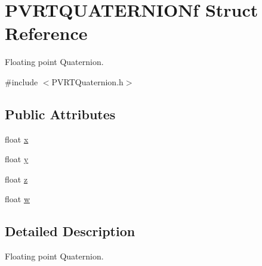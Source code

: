 \hypertarget{struct_p_v_r_t_q_u_a_t_e_r_n_i_o_nf}{\section{P\+V\+R\+T\+Q\+U\+A\+T\+E\+R\+N\+I\+O\+Nf Struct Reference}
\label{struct_p_v_r_t_q_u_a_t_e_r_n_i_o_nf}
}


Floating point Quaternion.  




{\ttfamily \#include $<$P\+V\+R\+T\+Quaternion.\+h$>$}

\subsection*{Public Attributes}
\begin{DoxyCompactItemize}
\item 
float \hyperlink{struct_p_v_r_t_q_u_a_t_e_r_n_i_o_nf_a1ff9af950eb62ececdcadcb53412c36d}{x}
\item 
float \hyperlink{struct_p_v_r_t_q_u_a_t_e_r_n_i_o_nf_abf4c8afb82239d9a6b051be41f98d166}{y}
\item 
float \hyperlink{struct_p_v_r_t_q_u_a_t_e_r_n_i_o_nf_a561786d0d1dac4408afe3369c88c9856}{z}
\item 
float \hyperlink{struct_p_v_r_t_q_u_a_t_e_r_n_i_o_nf_a3d9d748a6861ec57ad8ac2d959b53edf}{w}
\end{DoxyCompactItemize}


\subsection{Detailed Description}
Floating point Quaternion. 



 

